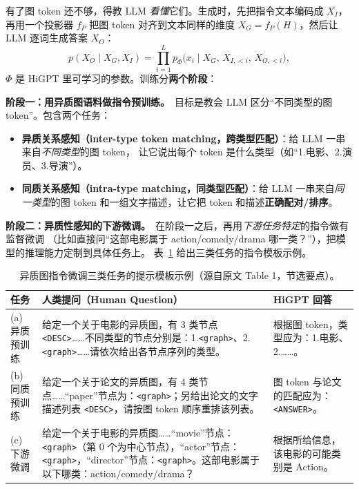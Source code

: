 \documentclass[11pt,UTF8,fontset=fandol]{ctexart}
\begin{document}
有了图 token 还不够，得教 LLM \emph{看懂}它们。生成时，先把指令文本编码成 $X_I$，
再用一个投影器 $f_P$ 把图 token 对齐到文本同样的维度 $X_G=f_P(H)$，然后让 LLM 逐词生成答案 $X_O$：
\begin{equation*}
  p(X_O\mid X_G,X_I)=\prod_{i=1}^{L} p_{\Phi}\big(x_i\mid X_G,\,X_{I,<i},\,X_{O,<i}\big),\tag{8}
\end{equation*}
$\Phi$ 是 HiGPT 里可学习的参数。训练分\textbf{两个阶段}：

\textbf{阶段一：用异质图语料做指令预训练。}\, 目标是教会 LLM 区分“不同类型的图 token”。包含两个任务：
\begin{itemize}[leftmargin=2em]
  \item \textbf{异质关系感知（inter-type token matching，跨类型匹配）}：给 LLM 一串来自\emph{不同类型}的图 token，
        让它说出每个 token 是什么类型（如“1.电影、2.演员、3.导演”）。
  \item \textbf{同质关系感知（intra-type matching，同类型匹配）}：给 LLM 一串来自\emph{同一类型}的图 token
        和一组文字描述，让它把 token 和描述\textbf{正确配对/排序}。
\end{itemize}

\textbf{阶段二：异质性感知的下游微调。}\, 在阶段一之后，再用\emph{下游任务特定}的指令做有监督微调
（比如直接问“这部电影属于 action/comedy/drama 哪一类？”），把模型的推理能力定制到具体任务上。
表~\ref{fig:prompts} 给出三类任务的指令模板示例。

\begin{table}[H]\centering
\caption{异质图指令微调三类任务的提示模板示例（源自原文 Table 1，节选要点）。}
\begin{tabular}{@{}p{2.6cm}p{7.2cm}p{4.6cm}@{}}
\toprule
\textbf{任务} & \textbf{人类提问（Human Question）} & \textbf{HiGPT 回答} \\
\midrule
(a) 异质预训练 & 给定一个关于电影的异质图，有 3 类节点 \texttt{<DESC>}……不同类型的节点分别是：1.\texttt{<graph>}、2.\texttt{<graph>}……请依次给出各节点序列的类型。 & 根据图 token，类型应为：1.电影、2.……。 \\
\addlinespace
(b) 同质预训练 & 给定一个关于论文的异质图，有 4 类节点……“paper”节点为：\texttt{<graph>}；另给出论文的文字描述列表 \texttt{<DESC>}，请按图 token 顺序重排该列表。 & 图 token 与论文的匹配应为：\texttt{<ANSWER>}。 \\
\addlinespace
(c) 下游微调 & 给定一个关于电影的异质图……“movie”节点：\texttt{<graph>}（第 0 个为中心节点），“actor”节点：\texttt{<graph>}，“director”节点：\texttt{<graph>}。这部电影属于以下哪类：action/comedy/drama？ & 根据所给信息，该电影的可能类别是 Action。 \\
\bottomrule
\end{tabular}
\label{fig:prompts}
\end{table}
\end{document}
